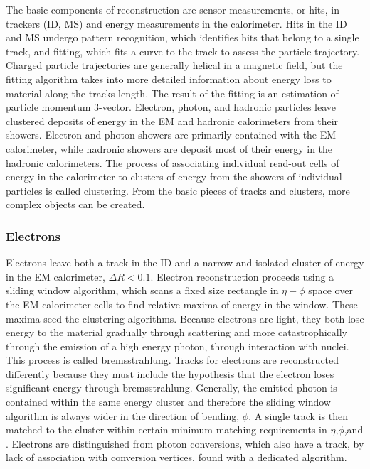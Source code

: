 The basic components of reconstruction are sensor measurements, or hits, in trackers (ID, MS) and energy measurements in the calorimeter. Hits in the ID and MS undergo pattern recognition, which identifies hits that belong to a single track, and fitting, which fits a curve to the track to assess the particle trajectory. Charged particle trajectories are generally helical in a magnetic field, but the fitting algorithm takes into more detailed information about energy loss to material along the tracks length. The result of the fitting is an estimation of particle momentum 3-vector. Electron, photon, and hadronic particles leave clustered deposits of energy in the EM and hadronic calorimeters from their showers. Electron and photon showers are primarily contained with the EM calorimeter, while hadronic showers are deposit most of their energy in the hadronic calorimeters. The process of associating individual read-out cells of energy in the calorimeter to clusters of energy from the showers of individual particles is called clustering. From the basic pieces of tracks and clusters, more complex objects can be created. 

\subsubsection{Electrons}

Electrons leave both a track in the ID and a narrow and isolated cluster of energy in the EM calorimeter, $\Delta R < 0.1$. Electron reconstruction proceeds using a sliding window algorithm, which scans a fixed size rectangle in $\eta-\phi$ space over the EM calorimeter cells to find relative maxima of energy in the window\cite{ATLAS-CONF-2014-032}. These maxima seed the clustering algorithms. Because electrons are light, they both lose energy to the material gradually through scattering and more catastrophically through the emission of a high energy photon, through interaction with nuclei. This process is called bremsstrahlung. Tracks for electrons are reconstructed differently because they must include the hypothesis that the electron loses significant energy through bremsstrahlung. Generally, the emitted photon is contained within the same energy cluster and therefore the sliding window algorithm is always wider in the direction of bending, $\phi$. A single track is then matched to the cluster within certain minimum matching requirements in $\eta$,$\phi$,and \pt. Electrons are distinguished from photon conversions, which also have a track, by lack of association with conversion vertices, found with a dedicated algorithm.

